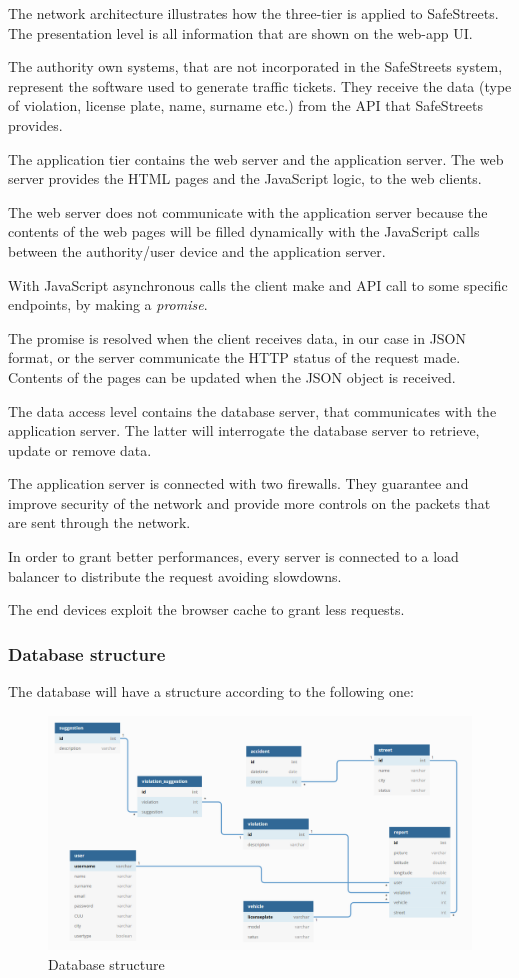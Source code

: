 The network architecture illustrates how the three-tier is applied to SafeStreets. The presentation level is all information that are shown on the web-app UI.

The authority own systems, that are not incorporated in the SafeStreets system, represent the software used to generate traffic tickets. They receive the data (type of violation, license plate, name, surname etc.) from the API that SafeStreets provides.

The application tier contains the web server and the application server. The web server provides the HTML pages and the JavaScript logic, to the web clients. 

The web server does not communicate with the application server because the contents of the web pages will be filled dynamically with the JavaScript calls between the authority/user device and the application server. 

With JavaScript asynchronous calls the client make and API call to some specific endpoints, by making a \textit{promise}.

The promise is resolved when the client receives data, in our case in JSON format, or the server communicate the HTTP status of the request made.
Contents of the pages can be updated when the JSON object is received.

The data access level contains the database server, that communicates with the application server.
The latter will interrogate the database server to retrieve, update or remove data.

The application server is connected with two firewalls.
They guarantee and improve security of the network and provide more controls on the packets that are sent through the network.

In order to grant better performances, every server is connected to a load balancer to distribute the request avoiding slowdowns.

The end devices exploit the browser cache to grant less requests.

\subsubsection{Database structure}
The database will have a structure according to the following one: 

\begin{figure}[H]
	\includegraphics[width=0.95\linewidth, height=0.50\textheight]{../DD/Images/ER}
	\caption{Database structure}
	\label{Database structure}
\end{figure}

